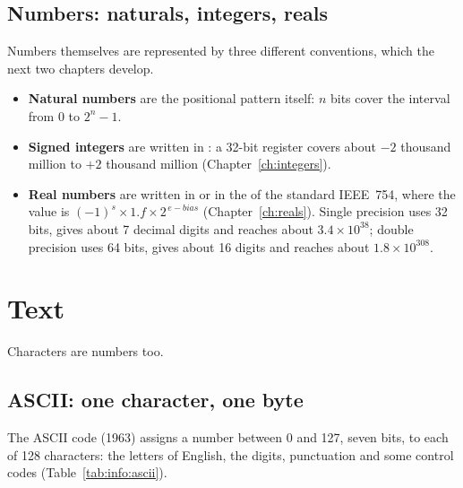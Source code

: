 \subsection{Numbers: naturals, integers, reals}

Numbers themselves are represented by three different conventions, which the
next two chapters develop.

\begin{itemize}
\item \textbf{Natural numbers} are the positional pattern itself: $n$ bits
  cover the interval from 0 to $2^{n}-1$.
\item \textbf{Signed integers} are written in : a
  32-bit register covers about $-2$ thousand million to $+2$ thousand million
  (Chapter~\ref{ch:integers}).
\item \textbf{Real numbers} are written in  or in the
   of the standard IEEE~754, where the value is
  $(-1)^{s}\times 1.f\times 2^{\,e-\mathit{bias}}$
  (Chapter~\ref{ch:reals}). Single precision uses 32 bits, gives about 7
  decimal digits and reaches about $3.4\times 10^{38}$; double precision uses
  64 bits, gives about 16 digits and reaches about $1.8\times 10^{308}$.
\end{itemize}

\section{Text}

Characters are numbers too.

\subsection{ASCII: one character, one byte}

The ASCII code (1963) assigns a number between 0 and 127, seven bits, to each
of 128 characters: the letters of English, the digits, punctuation and some
control codes (Table~\ref{tab:info:ascii}).

